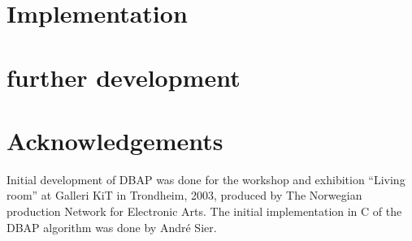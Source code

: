 \documentclass[twoside,10pt]{article}
\begin{document}
\section{Implementation}








\section{further development}


\section{Acknowledgements}

Initial development of DBAP was done for the workshop and exhibition ``Living room'' at Galleri KiT in Trondheim, 2003, produced by The Norwegian production Network for Electronic Arts. The initial implementation in C of the DBAP algorithm was done by André Sier. 




\end{document}
